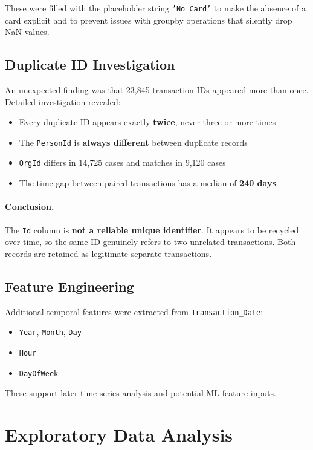 \documentclass[11pt,a4paper]{article}
\begin{document}
These were filled with the placeholder string \texttt{'No Card'} to make the absence of a card explicit and to prevent issues with groupby operations that silently drop NaN values.

\subsection{Duplicate ID Investigation}

An unexpected finding was that 23{,}845 transaction IDs appeared more than once. Detailed investigation revealed:

\begin{itemize}
    \item Every duplicate ID appears exactly \textbf{twice}, never three or more times
    \item The \texttt{PersonId} is \textbf{always different} between duplicate records
    \item \texttt{OrgId} differs in 14{,}725 cases and matches in 9{,}120 cases
    \item The time gap between paired transactions has a median of \textbf{240 days}
\end{itemize}

\paragraph{Conclusion.} The \texttt{Id} column is \textbf{not a reliable unique identifier}. It appears to be recycled over time, so the same ID genuinely refers to two unrelated transactions. Both records are retained as legitimate separate transactions.

\subsection{Feature Engineering}

Additional temporal features were extracted from \texttt{Transaction\_Date}:
\begin{itemize}
    \item \texttt{Year}, \texttt{Month}, \texttt{Day}
    \item \texttt{Hour}
    \item \texttt{DayOfWeek}
\end{itemize}

These support later time-series analysis and potential ML feature inputs.

\section{Exploratory Data Analysis}
\end{document}

